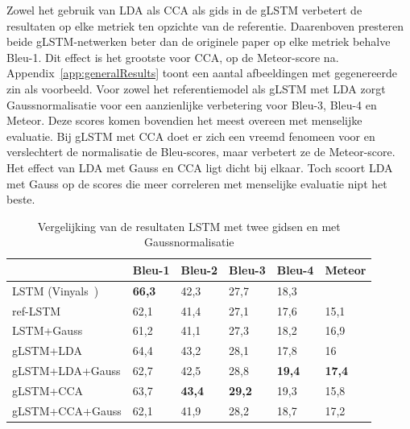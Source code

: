 Zowel het gebruik van LDA als CCA als gids in de gLSTM verbetert de resultaten op elke metriek ten opzichte van de referentie. Daarenboven presteren beide gLSTM-netwerken beter dan de originele paper op elke metriek behalve Bleu-1. Dit effect is het grootste voor CCA, op de Meteor-score na. Appendix~\ref{app:generalResults} toont een aantal afbeeldingen met gegenereerde zin als voorbeeld. Voor zowel het referentiemodel als gLSTM met LDA zorgt Gaussnormalisatie voor een aanzienlijke verbetering voor Bleu-3, Bleu-4 en Meteor. Deze scores komen bovendien het meest overeen met menselijke evaluatie. Bij gLSTM met CCA doet er zich een vreemd fenomeen voor en verslechtert de normalisatie de Bleu-scores, maar verbetert ze de Meteor-score. 
Het effect van LDA met Gauss en CCA ligt dicht bij elkaar. Toch scoort LDA met Gauss op de scores die meer correleren met menselijke evaluatie nipt het beste.
    \begin{table}
    	\centering
    	\begin{tabular}{llllll}
    		~                   & Bleu-1 & Bleu-2 & Bleu-3 & Bleu-4 & Meteor \\ \hline
    		LSTM (Vinyals~\cite{Google})      & \textbf{66,3}   & 42,3   & 27,7   & 18,3   & ~     \\ 
    		ref-LSTM         & 62,1   & 41,4   & 27,1   & 17,6   & 15,1  \\
    		LSTM+Gauss        & 61,2   & 41,1   & 27,3   & 18,2   & 16,9  \\
    		gLSTM+LDA         & 64,4   & 43,2   & 28,1   & 17,8   & 16  \\
    		gLSTM+LDA+Gauss & 62,7   & 42,5   & 28,8   & \textbf{19,4}   & \textbf{17,4}  \\
	        gLSTM+CCA         & 63,7   & \textbf{43,4}   & \textbf{29,2}   &19,3   & 15,8  \\
	        gLSTM+CCA+Gauss & 62,1   & 41,9   & 28,2   & 18,7   & 17,2  \\\hline
    	\end{tabular}
   	\caption{Vergelijking van de resultaten LSTM met twee gidsen en met Gaussnormalisatie}	
   	\label{table:lstm_results}
    \end{table}

